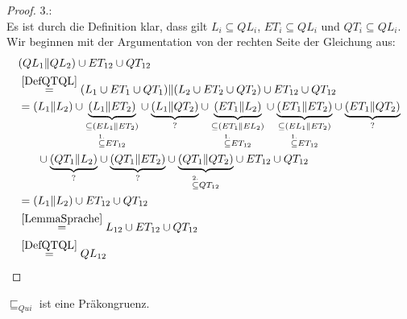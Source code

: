 \begin{proof}
  3.:\\
  Es ist durch die Definition klar, dass gilt $L_i\subseteq QL_i$,
  $ET_i\subseteq QL_i$ und $QT_i\subseteq QL_i$. Wir beginnen mit der
  Argumentation von der rechten Seite der Gleichung aus:
  \begin{align*}
    &(QL_1\| QL_2)\cup ET_{12}\cup QT_{12}\\
    &\overset{\ref{DefQTQL}}{=}(L_1\cup ET_1\cup QT_1)\|(L_2\cup ET_2\cup
    QT_2)\cup ET_{12}\cup QT_{12}\\
    &=(L_1\|L_2) \cup
    \underset{\overset{1.}{\subseteq} ET_{12}}{\underset{\subseteq
    (EL_1\|ET_2)}{\underbrace{(L_1\|ET_2)}}} \cup
    \underset{?}{\underbrace{(L_1\|QT_2)}} \cup
    \underset{\overset{1.}{\subseteq} ET_{12}}{\underset{\subseteq
    (ET_1\|EL_2)}{\underbrace{(ET_1\|L_2)}}} \cup
    \underset{\overset{1.}{\subseteq}
    ET_{12}}{\underset{\subseteq (EL_1\|ET_2)}{\underbrace{(ET_1\|ET_2)}}} \cup
    \underset{?}{\underbrace{(ET_1\|QT_2)}}\\
    &\hspace{0.6cm}\cup\underset{?}{\underbrace{(QT_1\|L_2)}} \cup
    \underset{?}{\underbrace{(QT_1\|ET_2)}} \cup
    \underset{\overset{2.}{\subseteq}
    QT_{12}}{\underbrace{(QT_1\|QT_2)}} \cup
    ET_{12}\cup QT_{12}\\
    &=(L_1\|L_2) \cup ET_{12}\cup QT_{12}\\
    &\overset{\ref{LemmaSprache}}{=}L_{12}\cup ET_{12}\cup QT_{12}\\
    &\overset{\ref{DefQTQL}}{=}QL_{12}
  \end{align*}
\end{proof}

\begin{prop}[Präkongruenz]
  $\sqsubseteq _{Qui}$ ist eine Präkongruenz.
\end{prop}

